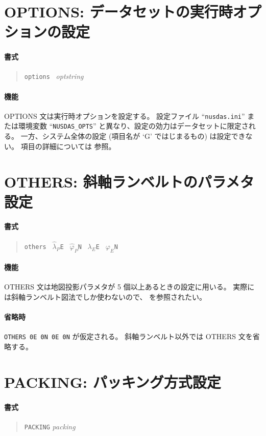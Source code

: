 \section{OPTIONS: データセットの実行時オプションの設定}
\label{sec:def:OPTIONS}
\paragraph{書式}
\begin{quote}
{\tt options} \ {\it optstring}
\end{quote}
\paragraph{機能}
OPTIONS 文は実行時オプションを設定する。
設定ファイル ``{\tt nusdas.ini}'' または環境変数 ``{\tt NUSDAS\_OPTS}''
と異なり、設定の効力はデータセットに限定される。
一方、システム全体の設定 (項目名が `G' ではじまるもの) は設定できない。
項目の詳細については  参照。

\section{OTHERS: 斜軸ランベルトのパラメタ設定}
\label{sec:def:OTHERS}
\paragraph{書式}
\begin{quote}
{\tt others} \ $\hat\lambda_P${\tt E} \ $\hat\varphi_P${\tt N}
	\ $\lambda_E${\tt E} \ $\varphi_E${\tt N}
\end{quote}
\paragraph{機能}
OTHERS 文は地図投影パラメタが 5 個以上あるときの設定に用いる。
実際には斜軸ランベルト図法でしか使わないので、
 を参照されたい。
\paragraph{省略時}
{\tt OTHERS 0E 0N 0E 0N} が仮定される。
斜軸ランベルト以外では OTHERS 文を省略する。

\section{PACKING: パッキング方式設定}
\label{sec:def:PACKING}
\paragraph{書式}
\begin{quote}
{\tt PACKING} {\it packing}
\end{quote}
